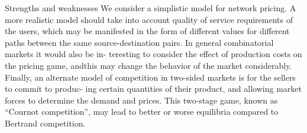 \documentclass{beamer}
\begin{document}
\begin{frame}{Strengths and weaknesses}
We consider a simplistic model for network pricing. A more realistic model should
take into account quality of service requirements of the users, which may be
manifested in the form of different values for different paths between the same
source-destination pairs. In general combinatorial markets it would also be in-
teresting to consider the effect of production costs on the pricing game, andthis may change the behavior of the market considerably. Finally, an alternate
model of competition in two-sided markets is for the sellers to commit to produc-
ing certain quantities of their product, and allowing market forces to determine
the demand and prices. This two-stage game, known as “Cournot competition”,
may lead to better or worse equilibria compared to Bertrand competition.
\end{frame}
\end{document}

